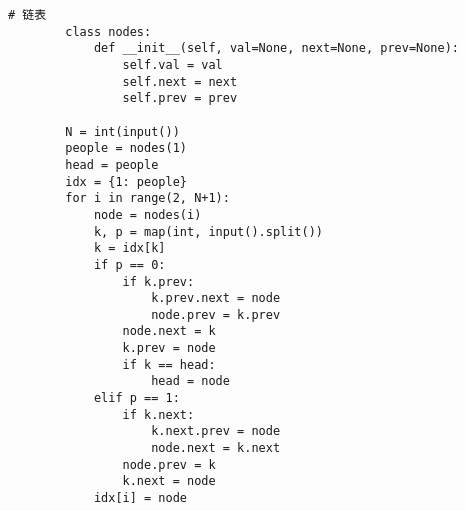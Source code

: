 \documentclass{ctexart}
\begin{document}
\begin{sloppy}

    \begin{lstlisting}[style = Python]
        # 链表
        class nodes:
            def __init__(self, val=None, next=None, prev=None):
                self.val = val
                self.next = next
                self.prev = prev
        
        N = int(input())
        people = nodes(1)
        head = people
        idx = {1: people}
        for i in range(2, N+1):
            node = nodes(i)
            k, p = map(int, input().split())
            k = idx[k]
            if p == 0:
                if k.prev:
                    k.prev.next = node
                    node.prev = k.prev
                node.next = k
                k.prev = node
                if k == head:
                    head = node
            elif p == 1:
                if k.next:
                    k.next.prev = node
                    node.next = k.next
                node.prev = k
                k.next = node
            idx[i] = node
            

\end{lstlisting}
\end{sloppy}
\end{document}
